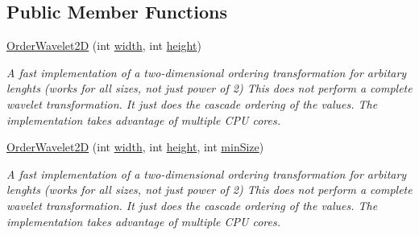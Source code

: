 \subsection*{\-Public \-Member \-Functions}
\begin{DoxyCompactItemize}
\item 
\hyperlink{class_turbo_wavelets_1_1_order_wavelet2_d_aed357d3d66affbf094ee6e104ac75f1f}{\-Order\-Wavelet2\-D} (int \hyperlink{class_turbo_wavelets_1_1_wavelet2_d_aaa4b3711957fe1798980e6891331a08d}{width}, int \hyperlink{class_turbo_wavelets_1_1_wavelet2_d_afb2aa87b89b82f329357cbdc0cde18a8}{height})
\begin{DoxyCompactList}\small\item\em \-A fast implementation of a two-\/dimensional ordering transformation for arbitary lenghts (works for all sizes, not just power of 2) \-This does not perform a complete wavelet transformation. \-It just does the cascade ordering of the values. \-The implementation takes advantage of multiple \-C\-P\-U cores. \end{DoxyCompactList}\item 
\hyperlink{class_turbo_wavelets_1_1_order_wavelet2_d_a22aec9d1c8fd7f56ac480a305ce4e9cd}{\-Order\-Wavelet2\-D} (int \hyperlink{class_turbo_wavelets_1_1_wavelet2_d_aaa4b3711957fe1798980e6891331a08d}{width}, int \hyperlink{class_turbo_wavelets_1_1_wavelet2_d_afb2aa87b89b82f329357cbdc0cde18a8}{height}, int \hyperlink{class_turbo_wavelets_1_1_wavelet2_d_af5148ef1a46dd5694ccea13aa8f1b9e2}{min\-Size})
\begin{DoxyCompactList}\small\item\em \-A fast implementation of a two-\/dimensional ordering transformation for arbitary lenghts (works for all sizes, not just power of 2) \-This does not perform a complete wavelet transformation. \-It just does the cascade ordering of the values. \-The implementation takes advantage of multiple \-C\-P\-U cores. \end{DoxyCompactList}\end{DoxyCompactItemize}
